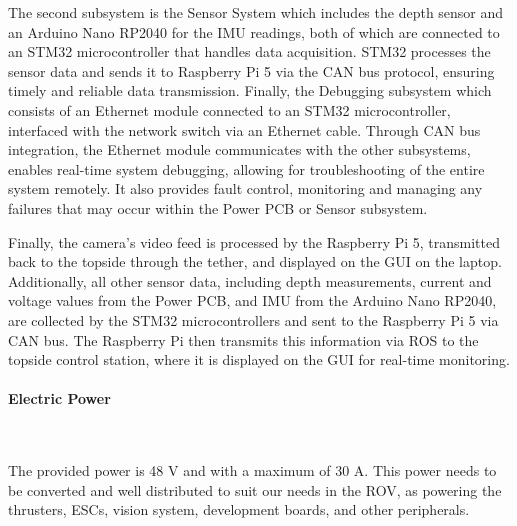 \begin{enumerate}[label=(\roman*), leftmargin=0pt, itemindent=20pt]
    \vspace{-0.2cm}
    \hspace{10pt} The second subsystem is the Sensor System which includes the depth sensor and an Arduino Nano RP2040 for the IMU readings, both of which are connected to an STM32 microcontroller that handles data acquisition. STM32 processes the sensor data and sends it to Raspberry Pi 5 via the CAN bus protocol, ensuring timely and reliable data transmission. Finally, the Debugging subsystem which consists of an Ethernet module connected to an STM32 microcontroller, interfaced with the network switch via an Ethernet cable. Through CAN bus integration, the Ethernet module communicates with the other subsystems, enables real-time system debugging, allowing for troubleshooting of the entire system remotely. It also provides fault control, monitoring and managing any failures that may occur within the Power PCB or Sensor subsystem.
    
    \vspace{-0.2cm}
    \hspace{10pt} Finally, the camera’s video feed is processed by the Raspberry Pi 5, transmitted back to the topside through the tether, and displayed on the GUI on the laptop. Additionally, all other sensor data, including depth measurements, current and voltage values from the Power PCB, and IMU from the Arduino Nano RP2040, are collected by the STM32 microcontrollers and sent to the Raspberry Pi 5 via CAN bus. The Raspberry Pi then transmits this information via ROS to the topside control station, where it is displayed on the GUI for real-time monitoring.
\end{enumerate}

\vspace{-1cm}
\paragraph{Electric Power} \ \\
\vspace{-0.5cm}

The provided power is 48 V and with a maximum of 30 A. This power needs to be converted and well distributed to suit our needs in the ROV, as powering the thrusters, ESCs, vision system, development boards, and other peripherals.

